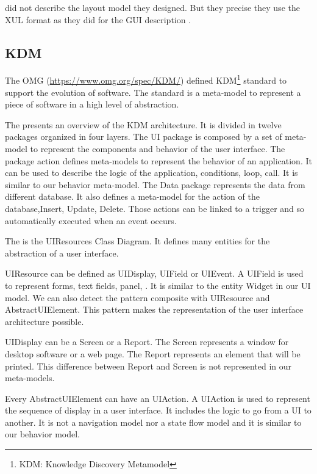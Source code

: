 \documentclass[conference]{IEEEtran}
\begin{document}
\citet{samir2007swing2script} did not describe the layout model they designed.
But they precise they use the XUL format as they did for the GUI description .


\subsection{KDM}
\label{sec:kdm}


The OMG (\url{https://www.omg.org/spec/KDM/}) defined KDM\footnote{KDM: Knowledge Discovery Metamodel} standard to support the evolution of software.
The standard is a meta-model to represent a piece of software in a high level of abstraction.


The  presents an overview of the KDM architecture.
It is divided in twelve packages organized in four layers.
The UI package is composed by a set of meta-model to represent
    the components and behavior of the user interface.
The package action defines meta-models to represent the behavior of an application.
It can be used to describe the logic of the application, \eg conditions, loop, call.
It is similar to our behavior meta-model.
The Data package represents the data from different database.
It also defines a meta-model for the action of the database,\eg Insert, Update, Delete.
Those actions can be linked to a trigger and so automatically executed when an event occurs.


The  is the UIResources Class Diagram.
It defines many entities for the abstraction of a user interface.

UIResource can be defined as UIDisplay, UIField or UIEvent.
A UIField is used to represent forms, text fields, panel, \etc.
It is similar to the entity Widget in our UI model.
We can also detect the pattern composite with
    UIResource and AbstractUIElement.
This pattern makes the representation of the
    user interface architecture possible.

UIDisplay can be a Screen or a Report.
The Screen represents a window for desktop software or a web page.
The Report represents an element that will be printed.
This difference between Report and Screen is not represented in our meta-models.

Every AbstractUIElement can have an UIAction.
A UIAction is used to represent the sequence of display in a user interface.
It includes the logic to go from a UI to another.
It is not a navigation model nor a state flow model and
    it is similar to our behavior model.
\end{document}
